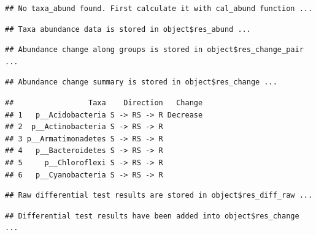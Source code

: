 \documentclass[
]{book}
\newenvironment{Shaded}{\begin{snugshade}}{\end{snugshade}}
\newcommand{\AttributeTok}[1]{\textcolor[rgb]{0.77,0.63,0.00}{#1}}
\newcommand{\CommentTok}[1]{\textcolor[rgb]{0.56,0.35,0.01}{\textit{#1}}}
\newcommand{\ConstantTok}[1]{\textcolor[rgb]{0.00,0.00,0.00}{#1}}
\newcommand{\FunctionTok}[1]{\textcolor[rgb]{0.00,0.00,0.00}{#1}}
\newcommand{\NormalTok}[1]{#1}
\newcommand{\SpecialCharTok}[1]{\textcolor[rgb]{0.00,0.00,0.00}{#1}}
\newcommand{\StringTok}[1]{\textcolor[rgb]{0.31,0.60,0.02}{#1}}
\begin{document}
\begin{verbatim}
## No taxa_abund found. First calculate it with cal_abund function ...
\end{verbatim}

\begin{verbatim}
## Taxa abundance data is stored in object$res_abund ...
\end{verbatim}

\begin{verbatim}
## Abundance change along groups is stored in object$res_change_pair ...
\end{verbatim}

\begin{verbatim}
## Abundance change summary is stored in object$res_change ...
\end{verbatim}

\begin{Shaded}
\end{Shaded}

\begin{verbatim}
##                 Taxa    Direction   Change
## 1   p__Acidobacteria S -> RS -> R Decrease
## 2  p__Actinobacteria S -> RS -> R         
## 3 p__Armatimonadetes S -> RS -> R         
## 4   p__Bacteroidetes S -> RS -> R         
## 5     p__Chloroflexi S -> RS -> R         
## 6   p__Cyanobacteria S -> RS -> R
\end{verbatim}

\begin{Shaded}
\end{Shaded}

\begin{verbatim}
## Raw differential test results are stored in object$res_diff_raw ...
\end{verbatim}

\begin{verbatim}
## Differential test results have been added into object$res_change ...
\end{verbatim}
\end{document}
